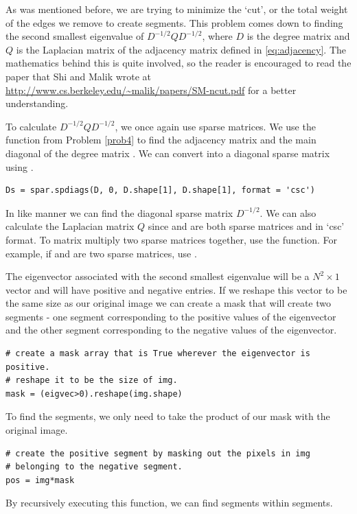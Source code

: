 As was mentioned before, we are trying to minimize the `cut', or the total weight of the edges we remove to create segments. This problem comes down to finding the second smallest eigenvalue of $D^{-1/2}QD^{-1/2}$, where $D$ is the degree matrix and $Q$ is the Laplacian matrix of the adjacency matrix defined in \eqref{eq:adjacency}. The mathematics behind this is quite involved, so the reader is encouraged to read the paper that Shi and Malik wrote at \url{http://www.cs.berkeley.edu/~malik/papers/SM-ncut.pdf} for a better understanding.
	
To calculate $D^{-1/2}QD^{-1/2}$, we once again use sparse matrices. We use the  function from Problem \ref{prob4} to find the adjacency matrix  and the main diagonal of the degree matrix . We can convert  into a diagonal sparse matrix using .

\begin{lstlisting}
Ds = spar.spdiags(D, 0, D.shape[1], D.shape[1], format = 'csc')
\end{lstlisting}

In like manner we can find the diagonal sparse matrix $D^{-1/2}$. We can also calculate the Laplacian matrix $Q$ since  and  are both sparse matrices and in `csc' format. To matrix multiply two sparse matrices together, use the  function. For example, if  and  are two sparse matrices, use .

The eigenvector associated with the second smallest eigenvalue will be a $N^2 \times 1$ vector and will have positive and negative entries. If we reshape this vector to be the same size as our original image we can create a mask that will create two segments - one segment corresponding to the positive values of the eigenvector and the other segment corresponding to the negative values of the eigenvector. 

\begin{lstlisting}
# create a mask array that is True wherever the eigenvector is positive.
# reshape it to be the size of img.
mask = (eigvec>0).reshape(img.shape)
\end{lstlisting}
To find the segments, we only need to take the product of our mask with the original image.

\begin{lstlisting}
# create the positive segment by masking out the pixels in img 
# belonging to the negative segment.
pos = img*mask
\end{lstlisting}
By recursively executing this function, we can find segments within segments.


